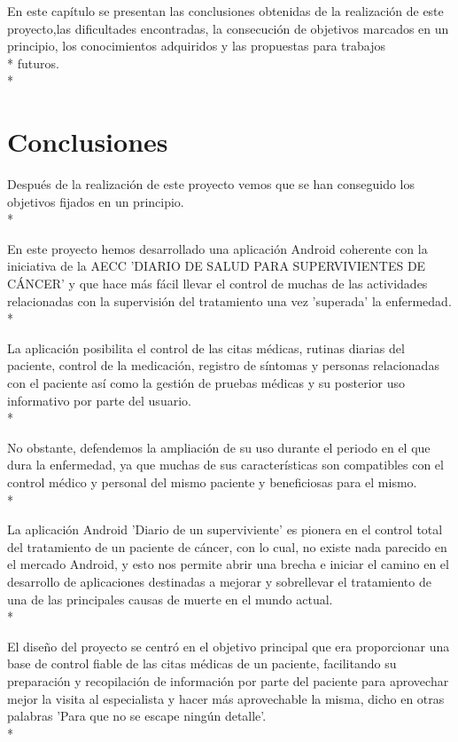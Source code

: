 \documentclass[../pfc.tex]{subfiles}
\begin{document}
	
	En este capítulo se presentan las conclusiones obtenidas de la realización de este proyecto,las dificultades encontradas, la consecución de objetivos marcados en un principio, los conocimientos adquiridos y las propuestas para trabajos\\* futuros.\\*
	
	\section{Conclusiones}
	
	Después de la realización de este proyecto vemos que se han conseguido los objetivos fijados en un principio.\\*
	
	En este proyecto hemos desarrollado una aplicación Android coherente con la iniciativa de la AECC 'DIARIO DE SALUD PARA SUPERVIVIENTES DE CÁNCER' y que hace más fácil llevar el control de muchas de las actividades relacionadas con la supervisión del tratamiento una vez 'superada' la enfermedad.\\*
	
	La aplicación posibilita el control de las citas médicas, rutinas diarias del paciente, control de la medicación, registro de síntomas y personas relacionadas con el paciente así como la gestión de pruebas médicas y su posterior uso informativo por parte del usuario.\\*
	
	No obstante, defendemos la ampliación de su uso durante el periodo en el que dura la enfermedad, ya que muchas de sus características son compatibles con el control médico y personal del mismo paciente y beneficiosas para el mismo.\\*

	La aplicación Android 'Diario de un superviviente' es pionera en el control total del tratamiento de un paciente de cáncer, con lo cual, no existe nada parecido en el mercado Android, y esto nos permite abrir una brecha e iniciar el camino en el desarrollo de aplicaciones destinadas a mejorar y sobrellevar el tratamiento de una de las principales causas de muerte en el mundo actual.\\*
	
	El diseño del proyecto se centró en el objetivo principal que era proporcionar una base de control fiable de las citas médicas de un paciente, facilitando su preparación y recopilación de información por parte del paciente para aprovechar mejor la visita al especialista y hacer más aprovechable la misma, dicho en otras palabras 'Para que no se escape ningún detalle'.\\*
	
\end{document}

